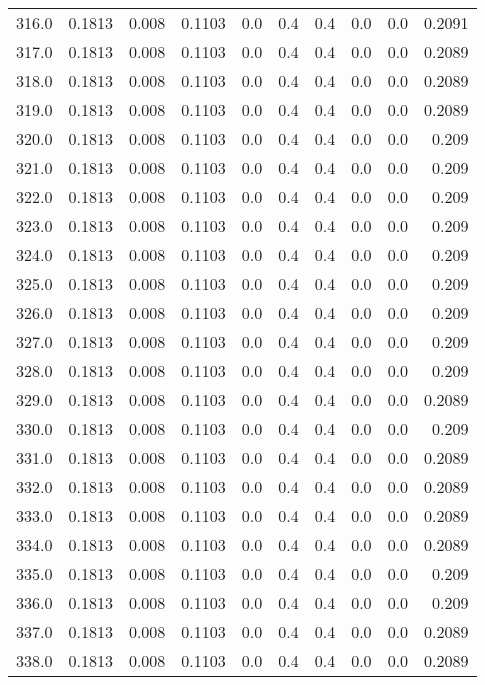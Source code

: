 \begin{longtable}{lrrrrrrrrr}
316.0 & 0.1813 & 0.008 & 0.1103 & 0.0 & 0.4 & 0.4 & 0.0 & 0.0 & 0.2091 \\
317.0 & 0.1813 & 0.008 & 0.1103 & 0.0 & 0.4 & 0.4 & 0.0 & 0.0 & 0.2089 \\
318.0 & 0.1813 & 0.008 & 0.1103 & 0.0 & 0.4 & 0.4 & 0.0 & 0.0 & 0.2089 \\
319.0 & 0.1813 & 0.008 & 0.1103 & 0.0 & 0.4 & 0.4 & 0.0 & 0.0 & 0.2089 \\
320.0 & 0.1813 & 0.008 & 0.1103 & 0.0 & 0.4 & 0.4 & 0.0 & 0.0 & 0.209 \\
321.0 & 0.1813 & 0.008 & 0.1103 & 0.0 & 0.4 & 0.4 & 0.0 & 0.0 & 0.209 \\
322.0 & 0.1813 & 0.008 & 0.1103 & 0.0 & 0.4 & 0.4 & 0.0 & 0.0 & 0.209 \\
323.0 & 0.1813 & 0.008 & 0.1103 & 0.0 & 0.4 & 0.4 & 0.0 & 0.0 & 0.209 \\
324.0 & 0.1813 & 0.008 & 0.1103 & 0.0 & 0.4 & 0.4 & 0.0 & 0.0 & 0.209 \\
325.0 & 0.1813 & 0.008 & 0.1103 & 0.0 & 0.4 & 0.4 & 0.0 & 0.0 & 0.209 \\
326.0 & 0.1813 & 0.008 & 0.1103 & 0.0 & 0.4 & 0.4 & 0.0 & 0.0 & 0.209 \\
327.0 & 0.1813 & 0.008 & 0.1103 & 0.0 & 0.4 & 0.4 & 0.0 & 0.0 & 0.209 \\
328.0 & 0.1813 & 0.008 & 0.1103 & 0.0 & 0.4 & 0.4 & 0.0 & 0.0 & 0.209 \\
329.0 & 0.1813 & 0.008 & 0.1103 & 0.0 & 0.4 & 0.4 & 0.0 & 0.0 & 0.2089 \\
330.0 & 0.1813 & 0.008 & 0.1103 & 0.0 & 0.4 & 0.4 & 0.0 & 0.0 & 0.209 \\
331.0 & 0.1813 & 0.008 & 0.1103 & 0.0 & 0.4 & 0.4 & 0.0 & 0.0 & 0.2089 \\
332.0 & 0.1813 & 0.008 & 0.1103 & 0.0 & 0.4 & 0.4 & 0.0 & 0.0 & 0.2089 \\
333.0 & 0.1813 & 0.008 & 0.1103 & 0.0 & 0.4 & 0.4 & 0.0 & 0.0 & 0.2089 \\
334.0 & 0.1813 & 0.008 & 0.1103 & 0.0 & 0.4 & 0.4 & 0.0 & 0.0 & 0.2089 \\
335.0 & 0.1813 & 0.008 & 0.1103 & 0.0 & 0.4 & 0.4 & 0.0 & 0.0 & 0.209 \\
336.0 & 0.1813 & 0.008 & 0.1103 & 0.0 & 0.4 & 0.4 & 0.0 & 0.0 & 0.209 \\
337.0 & 0.1813 & 0.008 & 0.1103 & 0.0 & 0.4 & 0.4 & 0.0 & 0.0 & 0.2089 \\
338.0 & 0.1813 & 0.008 & 0.1103 & 0.0 & 0.4 & 0.4 & 0.0 & 0.0 & 0.2089 \\

\end{longtable}
